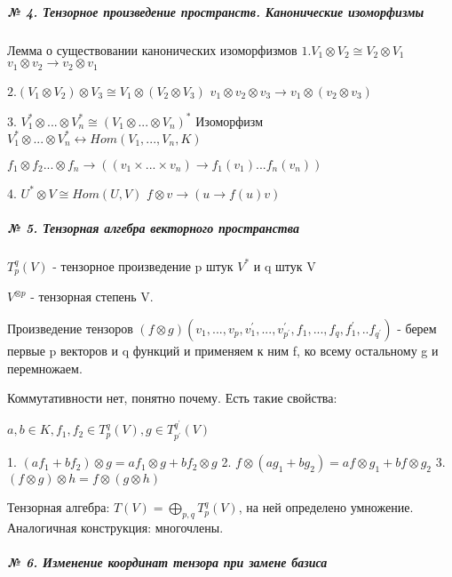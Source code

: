\documentclass{article}
\begin{document}
\subparagraph{\tiny № 4. Тензорное произведение пространств. Канонические изоморфизмы}

\begin{flushleft}

Лемма о существовании канонических изоморфизмов
$1. V_1 \otimes V_2 \cong V_2 \otimes V_1$
$v_1 \otimes v_2 \rightarrow v_2 \otimes v_1$

$2. (V_1 \otimes V_2) \otimes V_3 \cong V_1 \otimes (V_2 \otimes V_3)$
$v_1 \otimes v_2 \otimes v_3 \rightarrow v_1 \otimes (v_2 \otimes v_3)$

3. $V_1^* \otimes ... \otimes V_n^* \cong (V_1 \otimes ... \otimes V_n)^*$
Изоморфизм $V_1^* \otimes ... \otimes V_n^* \leftrightarrow Hom(V_1, ..., V_n, K)$

$f_1 \otimes f_2 ... \otimes f_n \rightarrow ((v_1 \times ... \times v_n) \rightarrow f_1(v_1)...f_n(v_n))$

4. $U^* \otimes V \cong Hom(U, V)$
$f \otimes v \rightarrow (u \rightarrow f(u)v)$

\end{flushleft}


\subparagraph{\tiny № 5. Тензорная алгебра векторного пространства}

\begin{flushleft}

$T_p^q(V)$ - тензорное произведение p штук $V^*$ и q штук V

$V^{\otimes p}$ - тензорная степень V.

Произведение тензоров
$(f \otimes g) (v_1, ..., v_p, v_1^\prime, ..., v_{p^\prime}^\prime, f_1, ..., f_q, f_1^\prime, .. f_{q^\prime})$ - берем первые p векторов и q функций и применяем к ним f, ко всему остальному g и перемножаем.

Коммутативности нет, понятно почему.
Есть такие свойства:

$a, b \in K, f_1, f_2 \in T_p^q(V), g \in T_{p^\prime}^{q^\prime}(V)$

1. $(af_1 + bf_2) \otimes g = af_1 \otimes g + bf_2 \otimes g$
2. $f \otimes (ag_1 + bg_2) = af\otimes g_1 + bf \otimes g_2$
3. $(f \otimes g) \otimes h = f \otimes (g \otimes h)$

Тензорная алгебра:
$T(V) = \bigoplus\limits_{p, q}{T_p^q(V)}$, на ней определено умножение.
Аналогичная конструкция: многочлены.


\end{flushleft}

\subparagraph{\tiny № 6. Изменение координат тензора при замене базиса}
\end{document}
